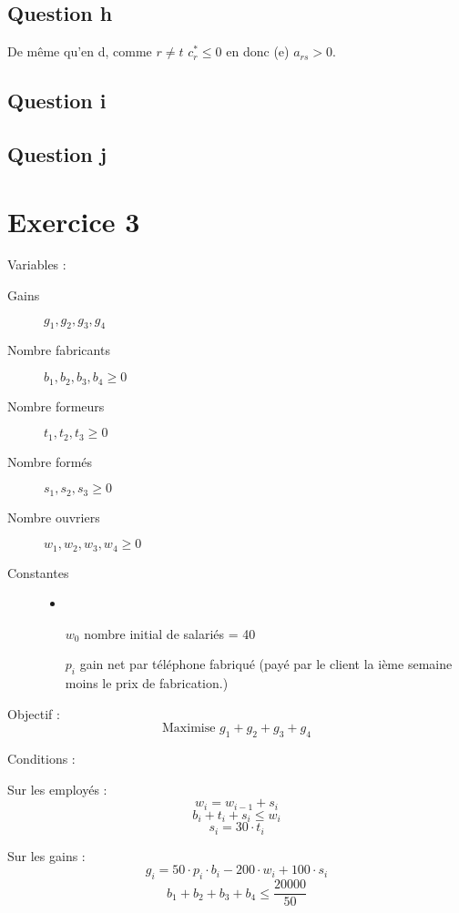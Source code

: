 \documentclass{article}
\begin{document}
\subsection*{Question h} 

De même qu'en d, comme $r\neq t$ $c_r^* \leq 0$ en donc (e) $a_{rs}>0$.

\subsection*{Question i} 

\subsection*{Question j} 




\section*{Exercice 3}

Variables :
\begin{description}
\item[Gains] $g_1,g_2,g_3,g_4$
\item[Nombre fabricants] $b_1,b_2,b_3,b_4\geq 0$
\item[Nombre formeurs] $t_1,t_2,t_3\geq 0$
\item[Nombre formés] $s_1,s_2,s_3\geq 0$
\item[Nombre ouvriers] $w_1,w_2,w_3,w_4\geq 0$
\item[Constantes]
\begin{itemize}
\item
\item[$w_0$] nombre initial de salariés = 40
\item[$p_i$] gain net par téléphone fabriqué (payé par le client la ième semaine moins le prix de fabrication.)
\end{itemize}
\end{description}


Objectif : $$\text{Maximise }g_1+g_2+g_3+g_4$$

Conditions : 

Sur les employés :
$$w_i =  w_{i-1}+s_i$$
$$b_i+t_i+s_i\leq w_i$$
$$s_i=30\cdot t_i$$

Sur les gains :
$$g_i = 50\cdot p_i \cdot b_i-200\cdot w_i+100\cdot s_i$$
$$b_1+b_2+b_3+b_4\leq \frac{20000}{50}$$
\end{document}

